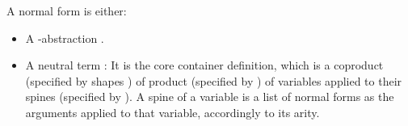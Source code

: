 \begin{code}
\<%
\\
%
\>[6]\AgdaSpace{}%
\AgdaSymbol{:}\AgdaSpace{}%
\AgdaSymbol{(}\AgdaSpace{}%
\AgdaSymbol{:}\AgdaSpace{}%
\AgdaSpace{}%
\AgdaSpace{}%
\AgdaSymbol{)}\AgdaSpace{}%
\AgdaSymbol{(}\AgdaSpace{}%
\AgdaSymbol{:}\AgdaSpace{}%
\AgdaSymbol{)}\AgdaSpace{}%
\AgdaSymbol{(}\AgdaSpace{}%
\AgdaSymbol{:}\AgdaSpace{}%
\AgdaSpace{}%
\AgdaSpace{}%
\AgdaSymbol{)}\AgdaSpace{}%
\AgdaSpace{}%
\AgdaSpace{}%
\AgdaSpace{}%
\AgdaSpace{}%
\<%
\\
%
\\[\AgdaEmptyExtraSkip]%
%
\>[2]\AgdaSpace{}%
\AgdaSpace{}%
\AgdaSymbol{:}\AgdaSpace{}%
\AgdaSpace{}%
\AgdaSpace{}%
\AgdaSpace{}%
\AgdaSpace{}%
\AgdaSpace{}%
\AgdaSpace{}%
\AgdaSpace{}%
\<%
\\
\>[2][@{}l@{\AgdaIndent{0}}]%
\>[4]%
\>[8]\AgdaSymbol{:}\AgdaSpace{}%
\AgdaSpace{}%
\AgdaSpace{}%
\AgdaSpace{}%
\<%
\\
%
\>[4]\AgdaOperator{\AgdaInductiveConstructor{\AgdaUnderscore{},\AgdaUnderscore{}}}\AgdaSpace{}%
\AgdaSymbol{:}\AgdaSpace{}%
\AgdaSpace{}%
\AgdaSpace{}%
\AgdaSpace{}%
\AgdaSpace{}%
\AgdaSpace{}%
\AgdaSpace{}%
\AgdaSpace{}%
\AgdaSpace{}%
\AgdaSpace{}%
\AgdaSpace{}%
\AgdaSpace{}%
\AgdaSymbol{(}\AgdaSpace{}%
\AgdaSpace{}%
\AgdaSymbol{)}\AgdaSpace{}%
\<%
\end{code}

A normal form is either:

\begin{itemize}
  \item{A \lambda-abstraction .}
  \item{A neutral term : It is the core container definition, which is a coproduct (specified by shapes ) of product (specified by ) of variables applied to their spines (specified by ). A spine of a variable is a list of normal forms as the arguments applied to that variable, accordingly to its arity.}
\end{itemize}

